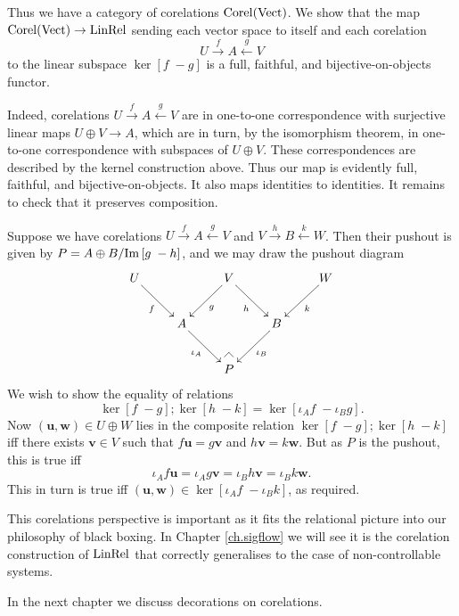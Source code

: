 Thus we have a category of corelations $\operatorname{{Corel}}(\mathrm{Vect})$. We show that the map
$\operatorname{{Corel}}(\mathrm{Vect}) \to \mathrm{LinRel}$ sending each vector space to itself and each
corelation
\[
  U \stackrel{f}\longrightarrow A \stackrel{g}\longleftarrow V
\]
to the linear subspace $\ker[f\;-g]$ is a full, faithful, and
bijective-on-objects functor.

Indeed, corelations $U \xrightarrow{f} A \xleftarrow{g} V$ are in one-to-one
correspondence with surjective linear maps $U\oplus V \to A$, which are in
turn, by the isomorphism theorem, in one-to-one correspondence with subspaces
of $U\oplus V$. These correspondences are described by the kernel construction
above. Thus our map is evidently full, faithful, and bijective-on-objects. It
also maps identities to identities. It remains to check that it preserves
composition.

Suppose we have corelations $U \xrightarrow{f} A \xleftarrow{g} V$
and $V \xrightarrow{h} B \xleftarrow{k} W$. Then their pushout is given by
$P=A \oplus B/\mathrm{Im}\,[g\;-h]$, and we may draw the pushout diagram
\[
  \xymatrix{
    U \ar[dr]_{f} & & V \ar[dl]^{g}  
    \ar[dr]_{h} & & W \ar[dl]^{k} {} 
    \\
    & A \ar[dr]_{\iota_A} & & B \ar[dl]^{\iota_B}  \\
    & & P {\save*!<0cm,-.5cm>[dl]@^{|-}\restore}
  }
\]
We wish to show the equality of relations
\[
  \ker[f\;-g];\ker[h\;-k] = \ker[\iota_A f\; -\iota_B g].
\]
Now $(\mathbf{u},\mathbf{w}) \in U \oplus W$ lies in the composite relation
$\ker[f\;-g];\ker[h\;-k]$ iff there exists $\mathbf{v} \in V$ such that
$f\mathbf{u} = g\mathbf{v}$ and $h\mathbf{v} = k\mathbf{w}$. But as $P$ is the
pushout, this is true iff 
\[
  \iota_A f \mathbf{u} = \iota_A g \mathbf{v} = \iota_B h \mathbf{v} =
  \iota_B k \mathbf{w}.
\]
This in turn is true iff $(\mathbf{u}, \mathbf{w}) \in \ker[\iota_Af\;
-\iota_Bk]$, as required. 

This corelations perspective is important as it fits the relational picture into
our philosophy of black boxing. In Chapter \ref{ch.sigflow} we will see it is
the corelation construction of $\mathrm{LinRel}$ that correctly generalises to the case
of non-controllable systems.
\smallskip

In the next chapter we discuss decorations on corelations.


